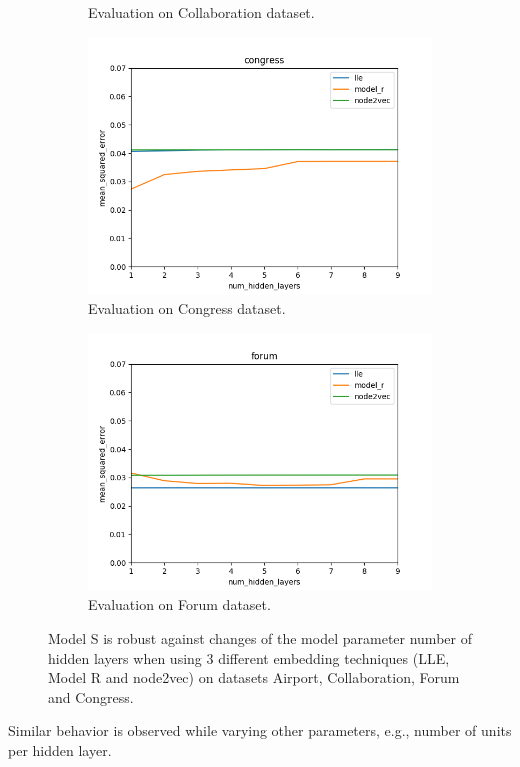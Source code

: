 \documentclass[12pt]{WSUThesis}
\theoremstyle{definition}
\begin{document}
\begin{figure}[ht]
\begin{subfigure}{0.49 \linewidth}
		\caption{Evaluation on Collaboration dataset.}
	\end{subfigure}
	\begin{subfigure}{0.49 \linewidth}
		\includegraphics[width=\linewidth]{num_hidden_layers_congress}
		\caption{Evaluation on Congress dataset.}
	\end{subfigure}
	\begin{subfigure}{0.49 \linewidth}
		\includegraphics[width=\linewidth]{num_hidden_layers_forum}
		\caption{Evaluation on Forum dataset.}
	\end{subfigure}
	\caption{
		Model S is robust against changes of the model parameter number of hidden layers when using 3 different embedding techniques (LLE, Model R and node2vec) on datasets Airport, Collaboration, Forum and Congress.
	}
	\label{fig:robust-num-hidden-layers}
\end{figure}
Similar behavior is observed while varying other parameters, e.g., number of units per hidden layer.
\end{document}
